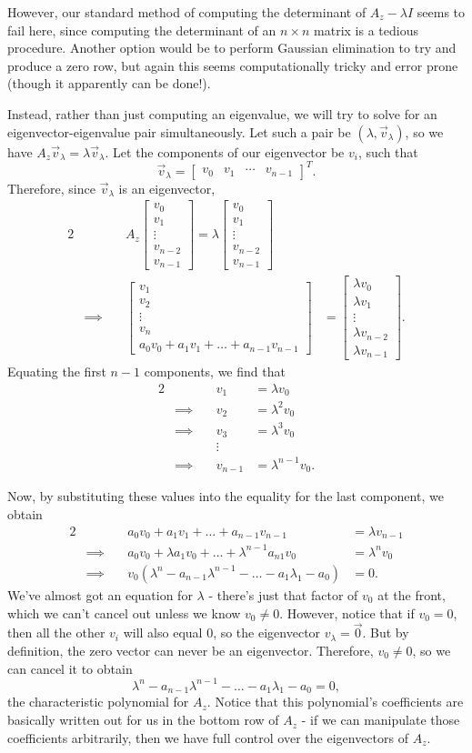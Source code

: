 \documentclass[letterpaper]{article}
\theoremstyle{remark}
\newcommand{\mat}[1]{\ensuremath{\begin{bmatrix}#1\end{bmatrix}}}
\newcommand{\eqn}[1]{\begin{alignat*}{2}#1\end{alignat*}}
\newcommand*{\thus}{&\implies\quad&}
\begin{document}
However, our standard method of computing the determinant of $A_z - \lambda I$ seems to fail here, since computing the determinant of an $n\times n$ matrix is a tedious procedure. Another option would be to perform Gaussian elimination to try and produce a zero row, but again this seems computationally tricky and error prone (though it apparently can be done!). 

Instead, rather than just computing an eigenvalue, we will try to solve for an eigenvector-eigenvalue pair simultaneously. Let such a pair be $(\lambda, \vec{v}_\lambda)$, so we have $A_z\vec{v}_\lambda = \lambda \vec{v}_\lambda$. Let the components of our eigenvector be $v_i$, such that
\[
    \vec{v}_\lambda = \mat{v_0 & v_1 & \cdots & v_{n-1}}^T.
\]
Therefore, since $\vec{v}_\lambda$ is an eigenvector,
\eqn{
    && A_z\mat{v_0 \\ v_1 \\ \vdots \\ v_{n-2} \\ v_{n-1}} = \lambda \mat{v_0 \\ v_1 \\ \vdots \\ v_{n-2} \\ v_{n-1}} \\
    \thus \mat{v_1 \\ v_2 \\ \vdots \\ v_n \\ a_0v_0 + a_1v_1 + \ldots + a_{n-1}v_{n-1} } &= \mat{\lambda v_0 \\ \lambda v_1 \\ \vdots \\ \lambda v_{n-2} \\ \lambda v_{n-1}}.
}
Equating the first $n - 1$ components, we find that
\eqn{
    && v_1 &= \lambda v_0 \\
    \thus v_2 &= \lambda^2 v_0 \\
    \thus v_3 &= \lambda^3 v_0 \\
    && \vdots \\
    \thus v_{n-1} &= \lambda^{n-1} v_0.
}

Now, by substituting these values into the equality for the last component, we obtain
\eqn{
    && a_0v_0 + a_1v_1 + \ldots + a_{n-1}v_{n-1} &= \lambda v_{n-1} \\
    \thus a_0v_0 + \lambda a_1v_0 + \ldots + \lambda^{n-1}a_{n1}v_0 &= \lambda^nv_0 \\
    \thus v_0(\lambda^n - a_{n-1}\lambda^{n-1} - \ldots - a_1\lambda_1 - a_0) &= 0.
}
We've almost got an equation for $\lambda$ - there's just that factor of $v_0$ at the front, which we can't cancel out unless we know $v_0 \ne 0$. However, notice that if $v_0 = 0$, then all the other $v_i$ will also equal $0$, so the eigenvector $v_\lambda = \vec{0}$. But by definition, the zero vector can never be an eigenvector. Therefore, $v_0 \ne 0$, so we can cancel it to obtain
\[
    \lambda^n - a_{n-1}\lambda^{n-1} - \ldots - a_1\lambda_1 - a_0 = 0,
\]
the characteristic polynomial for $A_z$. Notice that this polynomial's coefficients are basically written out for us in the bottom row of $A_z$ - if we can manipulate those coefficients arbitrarily, then we have full control over the eigenvectors of $A_z$.
\end{document}
